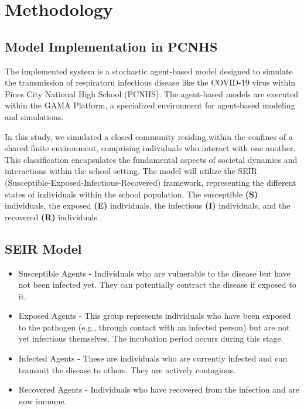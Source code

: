 \chapter{Methodology}
\label{chap:Methodology}

 
  \section{Model Implementation in PCNHS}
 The implemented system is a stochastic agent-based model designed to simulate the transmission of respiratoru infectious disease like the COVID-19 virus within Pines City National High School (PCNHS). The agent-based models are executed within the GAMA Platform, a specialized environment for agent-based modeling and simulations.
 
 In this study, we simulated a closed community residing within the confines of a shared finite environment, comprising individuals who interact with one another. This classification encapsulates the fundamental aspects of societal dynamics and interactions within the school setting. The model will utilize the SEIR (Susceptible-Exposed-Infectious-Recovered) framework, representing the different states of individuals within the school population. The susceptible \textbf{(S)} individuals, the exposed \textbf{ (E)} individuals, the infectious \textbf{ (I)} individuals, and the recovered \textbf{ (R)} individuals . 
 
 \section{SEIR Model}
 \begin{itemize}
 	\item Susceptible Agents - Individuals who are vulnerable to the disease but have not been infected yet. They can potentially contract the disease if exposed to it.
 	\item Exposed Agents - This group represents individuals who have been exposed to the pathogen (e.g., through contact with an infected person) but are not yet infectious themselves. The incubation period occurs during this stage.
 	\item Infected Agents -  These are individuals who are currently infected and can transmit the disease to others. They are actively contagious.
 	\item Recovered Agents -  Individuals who have recovered from the infection and are now immune.
 \end{itemize}
 
